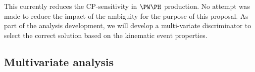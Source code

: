 \documentclass[a4paper,11pt]{article}
\begin{document}

This currently reduces the CP-sensitivity in $\PW\PH$ production. 
No attempt was made to reduce the impact of the ambiguity for the purpose of this proposal. 
As part of the analysis development, we will develop a multi-variate discriminator to select the correct solution based on the kinematic event properties.

\subsection{Multivariate analysis}
\end{document}
